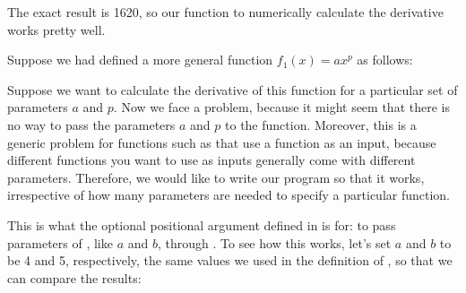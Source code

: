 \documentclass[letterpaper,10pt,english]{sphinxmanual}
\begin{document}
\begin{sphinxVerbatim}[commandchars=\\\{\}]
 
\end{sphinxVerbatim}

\sphinxAtStartPar
The exact result is 1620, so our function to numerically calculate the derivative works pretty well.

\sphinxAtStartPar
Suppose we had defined a more general function \(f_1(x)=ax^p\) as follows:

\begin{sphinxVerbatim}[commandchars=\\\{\}]
   
     
\end{sphinxVerbatim}

\sphinxAtStartPar
Suppose we want to calculate the derivative of this function for a particular set of parameters \(a\) and \(p\).  Now we face a problem, because it might seem that there is no way to pass the parameters \(a\) and \(p\) to the  function.  Moreover, this is a generic problem for functions such as  that use a function as an input, because different functions you want to use as inputs generally come with different parameters. Therefore, we would like to write our program  so that it works, irrespective of how many parameters are needed to specify a particular function.

\sphinxAtStartPar
This is what the optional positional argument  defined in  is for: to pass parameters of , like \(a\) and \(b\), through .  To see how this works, let’s set \(a\) and \(b\) to be 4 and 5, respectively, the same values we used in the definition of , so that we can compare the results:

\begin{sphinxVerbatim}[commandchars=\\\{\}]
    
\end{sphinxVerbatim}
\end{document}
